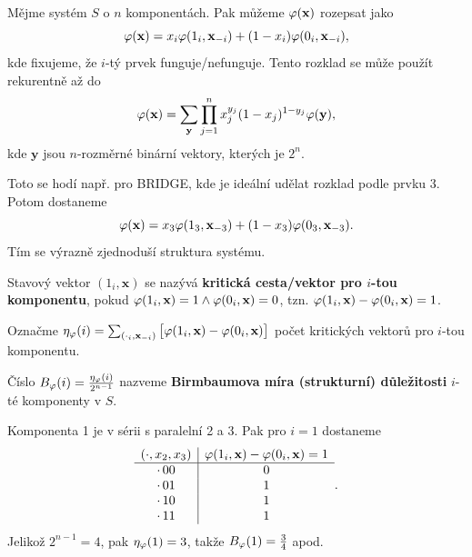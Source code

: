     \begin{theorem}
        Mějme systém $S$ o $n$ komponentách. Pak můžeme $\crossedphi(\textbf{x})$ rozepsat jako 
        $$\crossedphi(\textbf{x})=x_i\crossedphi(1_i,\textbf{x}_{-i})+(1-x_i)\crossedphi(0_i,\textbf{x}_{-i}),$$
        kde fixujeme, že $i$-tý prvek funguje/nefunguje. Tento rozklad se může použít rekurentně až do 
        $$\crossedphi(\textbf{x})=\sum_{\textbf{y}}\prod_{j=1}^n x_j^{y_j}(1-x_j)^{1-y_j}\crossedphi(\textbf{y}),$$ kde $\textbf{y}$ jsou $n$-rozměrné binární vektory, kterých je $2^n$.
    \end{theorem}

    Toto se hodí např. pro BRIDGE, kde je ideální udělat rozklad podle prvku 3. Potom dostaneme 
    $$ \crossedphi(\textbf{x})=x_3\crossedphi(1_3,\textbf{x}_{-3})+(1-x_3)\crossedphi(0_3,\textbf{x}_{-3}). $$ 
    Tím se výrazně zjednoduší struktura systému.

    \begin{define}
        Stavový vektor $(1_i,\textbf{x})$ se nazývá \textbf{kritická cesta/vektor pro $i$-tou komponentu}, pokud $\crossedphi(1_i,\textbf{x})=1\wedge \crossedphi(0_i,\textbf{x})=0 $, tzn. $\crossedphi(1_i,\textbf{x})-\crossedphi(0_i,\textbf{x})=1$.
        
        Označme $\eta_\crossedphi(i)=\sum_{(\cdot_i,\textbf{x}_{-i})} \big[\crossedphi(1_i,\textbf{x})-\crossedphi(0_i,\textbf{x})\big]$ počet kritických vektorů pro $i$-tou komponentu.
        
        Číslo $B_\crossedphi(i)=\frac{\eta_\crossedphi(i)}{2^{n-1}}$ nazveme \textbf{Birmbaumova míra (strukturní) důležitosti} $i$-té komponenty v $S$.
    \end{define}

    \begin{example}
        Komponenta 1 je v sérii s paralelní 2 a 3. Pak pro $i=1$ dostaneme
        $$\begin{array}{c|c}
            (\cdot,x_2,x_3) & \crossedphi(1_i,\textbf{x})-\crossedphi(0_i,\textbf{x})=1 \\\hline
            \cdot\,00 & 0 \\
            \cdot\,01 & 1 \\
            \cdot\,10 & 1 \\
            \cdot\,11 & 1 
        \end{array}.$$
        Jelikož $2^{n-1}=4$, pak $\eta_\crossedphi(1)=3$, takže $B_\crossedphi(1)=\frac{3}{4}$ apod.
        
    \end{example}


